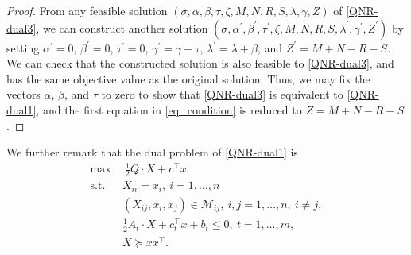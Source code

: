 \documentclass[pdflatex,sn-mathphys-num]{sn-jnl}%
\theoremstyle{thmstyleone}%
\theoremstyle{thmstyletwo}%
\theoremstyle{thmstylethree}%
\begin{document}
\begin{proof}
	From any feasible solution $(\sigma,\alpha,\beta,\tau,\zeta,M,N,R,S,\lambda,\gamma,Z)$ of \eqref{QNR-dual3}, we can construct another solution $(\sigma,\alpha^\prime,\beta^\prime,\tau^\prime,\zeta,M,N,R,S,\lambda^\prime,\gamma^\prime,Z^\prime)$ by setting $\alpha^\prime=0$, $\beta^\prime=0$, $\tau^\prime=0$, $\gamma^\prime=\gamma-\tau$, $\lambda^\prime=\lambda+\beta$, and $Z^\prime=M+N-R-S$. We can check that the constructed solution is also feasible to \eqref{QNR-dual3}, and has the same objective value as the original solution. Thus, we may fix the vectors $\alpha$, $\beta$, and $\tau$ to zero to show that \eqref{QNR-dual3} is equivalent to \eqref{QNR-dual1}, and the first equation in  \eqref{eq_condition} is reduced to $Z=M+N-R-S$.
\end{proof}


We further remark that the dual problem of \eqref{QNR-dual1} is
\begin{equation}\label{SDPRLTVI}\tag{SDP+RLT+VI}
	\begin{aligned}
		\max ~&~ \frac{1}{2}Q\cdot X+c^\top x\\
		\mbox{s.t.} ~&X_{ii}=x_i,~i=1,\ldots,n\\
		&(X_{ij},x_i,x_j)\in \mathcal{M}_{ij},~i,j=1,\ldots,n,~i\neq j,\\
		&\frac{1}{2}A_t\cdot X+c_t^\top x+b_t\leq 0,~t=1,\ldots,m,\\
		&X\succeq xx^\top.
	\end{aligned}
\end{equation}
\end{document}
